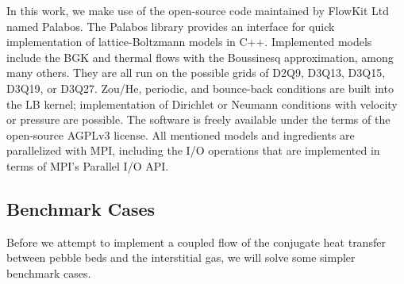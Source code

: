 In this work, we make use of the open-source code maintained by FlowKit Ltd named Palabos.\cite{Flow} The Palabos library provides an interface for quick implementation of lattice-Boltzmann models in C++. Implemented models include the BGK and thermal flows with the Boussinesq approximation, among many others. They are all run on the possible grids of D2Q9, D3Q13, D3Q15, D3Q19, or D3Q27. Zou/He, periodic, and bounce-back conditions are built into the LB kernel; implementation of Dirichlet or Neumann conditions with velocity or pressure are possible. The software is freely available under the terms of the open-source AGPLv3 license.\cite{FreeSoftwareFoundationInc.2007} All mentioned models and ingredients are parallelized with MPI, including the I/O operations that are implemented in terms of MPI’s Parallel I/O API.

\subsection{Benchmark Cases}
Before we attempt to implement a coupled flow of the conjugate heat transfer between pebble beds and the interstitial gas, we will solve some simpler benchmark cases.